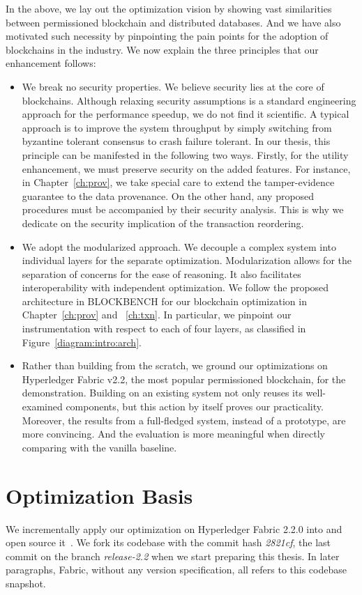 In the above, we lay out the optimization vision by showing vast similarities between permissioned blockchain and distributed databases. 
And we have also motivated such necessity by pinpointing the pain points for the adoption of blockchains in the industry. 
We now explain the three principles that our enhancement follows:

\begin{itemize}
  \item We break no security properties. We believe security lies at the core of blockchains. Although relaxing security assumptions is a standard engineering approach for the performance speedup, we do not find it scientific. A typical approach is to improve the system throughput by simply switching from byzantine tolerant consensus to crash failure tolerant. In our thesis, this principle can be manifested in the following two ways. Firstly, for the utility enhancement, we must preserve security on the added features. For instance, in Chapter~\ref{ch:prov}, we take special care to extend the tamper-evidence guarantee to the data provenance. On the other hand, any proposed procedures must be accompanied by their security analysis. This is why we dedicate  on the security implication of the transaction reordering. 
  \item We adopt the modularized approach. We decouple a complex system into individual layers for the separate optimization. Modularization allows for the separation of concerns for the ease of reasoning. It also facilitates interoperability with independent optimization. 
  We follow the proposed architecture in BLOCKBENCH for our blockchain optimization in Chapter~\ref{ch:prov} and ~\ref{ch:txn}. In particular, we pinpoint our instrumentation with respect to each of four layers, as classified in Figure~\ref{diagram:intro:arch}. 
  \item Rather than building from the scratch, we ground our optimizations on Hyperledger Fabric v2.2, the most popular permissioned blockchain, for the demonstration. Building on an existing system not only reuses its well-examined components, but this action by itself proves our practicality. Moreover, the results from a full-fledged system, instead of a prototype, are more convincing. And the evaluation is more meaningful when directly comparing with the vanilla baseline. 
\end{itemize}

\section{Optimization Basis}
We incrementally apply our optimization on Hyperledger Fabric 2.2.0 into {\fs} and open source it~\cite{fsharp}. We fork its codebase with the commit hash \textit{2821cf}, the last commit on the branch \textit{release-2.2} when we start preparing this thesis. In later paragraphs, Fabric, without any version specification, all refers to this codebase snapshot. 

